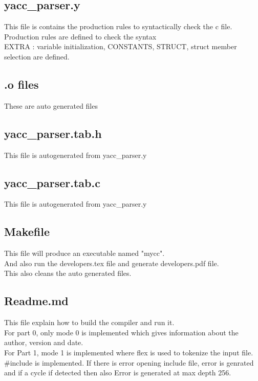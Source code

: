 \documentclass{article}
\begin{document}
\subsection*{yacc\_parser.y}
This file is contains the production rules to syntactically check the c file. \\
Production rules are defined to check the syntax \\
EXTRA : variable initialization, CONSTANTS, STRUCT, struct member selection are defined. \\

\subsection*{.o files}
These are auto generated files

\subsection*{yacc\_parser.tab.h}
This file is autogenerated from yacc\_parser.y \\

\subsection*{yacc\_parser.tab.c}
This file is autogenerated from yacc\_parser.y \\

\subsection*{Makefile}
This file will produce an executable named "mycc". \\
And also run the developers.tex file and generate developers.pdf file. \\
This also cleans the auto generated files. \\

\subsection*{Readme.md}
This file explain how to build the compiler and run it. \\
For part 0, only mode 0 is implemented which gives information about the author, version and date. \\
For Part 1,  mode 1 is implemented where flex is used to tokenize the input file. \\
$\#$include is implemented.
If there is error opening include file, error is genrated and if a cycle if detected then also Error is generated at max depth 256. \\
\end{document}
